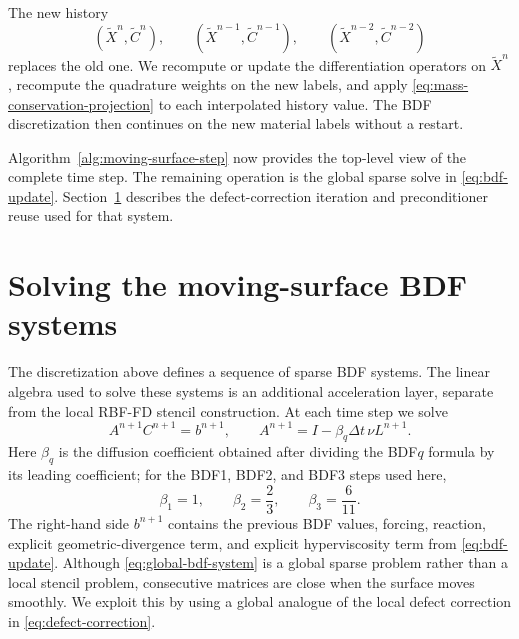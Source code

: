 \documentclass[a4paper,fleqn]{cas-sc}
\begin{document}
The new history
\[
  (\widetilde X^n,\widetilde C^n),\qquad
  (\widetilde X^{n-1},\widetilde C^{n-1}),\qquad
  (\widetilde X^{n-2},\widetilde C^{n-2})
\]
replaces the old one.  We recompute or update the differentiation operators on
$\widetilde X^n$, recompute the quadrature weights on the new labels, and
apply \eqref{eq:mass-conservation-projection} to each interpolated history
value.  The BDF discretization then continues on the new material labels without a restart.

Algorithm~\ref{alg:moving-surface-step} now provides the top-level view of the
complete time step.  The remaining operation is the global sparse solve in
\eqref{eq:bdf-update}.  Section~\ref{sec:global-bdf-linear-algebra}
describes the defect-correction iteration and preconditioner reuse used for
that system.

\section{Solving the moving-surface BDF systems}
\label{sec:global-bdf-linear-algebra}

The discretization above defines a sequence of sparse BDF systems.  The
linear algebra used to solve these systems is an additional acceleration
layer, separate from the local RBF-FD stencil construction.  At each time step
we solve
\begin{equation}
  A^{n+1}C^{n+1}=b^{n+1},
  \qquad
  A^{n+1}=I-\beta_q\Delta t\,\nu L^{n+1}.
  \label{eq:global-bdf-system}
\end{equation}
Here \(\beta_q\) is the diffusion coefficient obtained after dividing the
BDF\(q\) formula by its leading coefficient; for the BDF1, BDF2, and BDF3
steps used here,
\[
  \beta_1=1,\qquad \beta_2=\frac{2}{3},\qquad
  \beta_3=\frac{6}{11}.
\]
The right-hand side \(b^{n+1}\) contains the previous BDF values, forcing,
reaction, explicit geometric-divergence term, and explicit hyperviscosity
term from \eqref{eq:bdf-update}.  Although \eqref{eq:global-bdf-system} is a
global sparse problem rather than a local stencil problem, consecutive
matrices are close when the surface moves smoothly.  We exploit this by using
a global analogue of the local defect correction in
\eqref{eq:defect-correction}.
\end{document}
